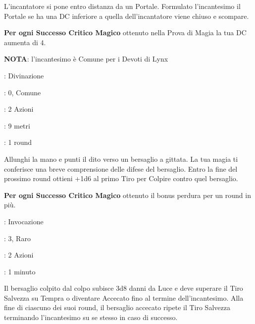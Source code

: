 \begin{multicols}{2}
L'incantatore si pone entro distanza da un Portale. Formulato l'incantesimo il Portale se ha una DC inferiore a quella dell'incantatore viene chiuso e scompare.

\textbf{Per ogni Successo Critico Magico} ottenuto nella Prova di Magia la tua DC aumenta di 4.

\textbf{NOTA}: l'incantesimo è Comune per i Devoti di Lynx

\noindent\colorbox{OBSSgold!10}{
\begin{minipage}{0.95\linewidth}
\begin{description}[noitemsep, topsep=0pt, parsep=0pt, partopsep=0pt, leftmargin=0cm, labelwidth=1.3cm]
	\item[\textbf{Lista}]: Divinazione
	\item[\textbf{Livello}]: 0, Comune
	\item[\textbf{Lancio}]: 2 Azioni
	\item[\textbf{Gittata}]: 9 metri
	\item[\textbf{Durata}]: 1 round
\end{description}
\end{minipage}}\smallskip

Allunghi la mano e punti il dito verso un bersaglio a gittata. La tua magia ti conferisce una breve comprensione delle difese del bersaglio. Entro la fine del prossimo round ottieni +1d6 al primo Tiro per Colpire contro quel bersaglio.

\textbf{Per ogni Successo Critico Magico} ottenuto il bonus perdura per un round in più.

\noindent\colorbox{OBSSgold!10}{
\begin{minipage}{0.95\linewidth}
\begin{description}[noitemsep, topsep=0pt, parsep=0pt, partopsep=0pt, leftmargin=0cm, labelwidth=1.3cm]
	\item[\textbf{Lista}]: Invocazione
	\item[\textbf{Livello}]: 3, Raro
	\item[\textbf{Lancio}]: 2 Azioni

	\item[\textbf{Durata}]: 1 minuto
\end{description}
\end{minipage}}\smallskip

Il bersaglio colpito dal colpo subisce 3d8 danni da Luce e deve superare il Tiro Salvezza su Tempra o diventare Accecato fino al termine dell'incantesimo. Alla fine di ciascuno dei suoi round, il bersaglio accecato ripete il Tiro Salvezza terminando l'incantesimo su se stesso in caso di successo.


\end{multicols}
